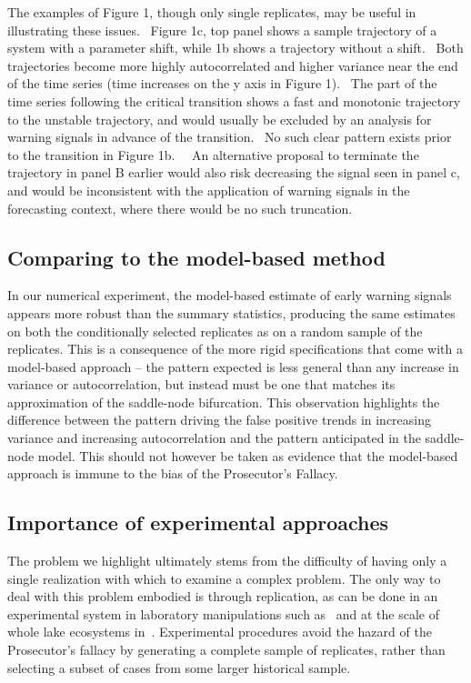 \documentclass[authoryear,review,12pt]{elsarticle}
\begin{document}
The examples of Figure 1, though only single replicates, may be useful
in illustrating these issues.  Figure 1c, top panel shows a sample
trajectory of a system with a parameter shift, while 1b shows a trajectory
without a shift.  Both trajectories become more highly autocorrelated
and higher variance near the end of the time series (time increases
on the y axis in Figure 1).  The part of the time series following
the critical transition shows a fast and monotonic trajectory to the
unstable trajectory, and would usually be excluded by an analysis for
warning signals in advance of the transition.  No such clear pattern
exists prior to the transition in Figure 1b.   An alternative proposal
to terminate the trajectory in panel B earlier would also risk decreasing
the signal seen in panel c, and would be inconsistent with the application
of warning signals in the forecasting context, where there would be no
such truncation.

\subsection{Comparing to the model-based method}

In our numerical experiment, the model-based estimate of early warning
signals appears more robust than the summary statistics, producing
the same estimates on both the conditionally selected replicates as on
a random sample of the replicates.  This is a consequence of the more
rigid specifications that come with a model-based approach -- the pattern
expected is less general than any increase in variance or autocorrelation,
but instead must be one that matches its approximation of the saddle-node
bifurcation. This observation highlights the difference between the
pattern driving the false positive trends in increasing variance and
increasing autocorrelation and the pattern anticipated in the saddle-node
model. This should not however be taken as evidence that the model-based
approach is immune to the bias of the Prosecutor's Fallacy.


\subsection{Importance of experimental approaches} The problem we
highlight ultimately stems from the difficulty of having only a single
realization with which to examine a complex problem.  The only way
to deal with this problem embodied is through replication, as can
be done in an experimental system in laboratory manipulations such
as~\citet{Drake2010, Veraart2011, Dai2012} and at the scale of whole
lake ecosystems in~\citet{Carpenter2011}.  Experimental procedures avoid
the hazard of the Prosecutor's fallacy by generating a complete sample
of replicates, rather than selecting a subset of cases from some larger
historical sample.
\end{document}
